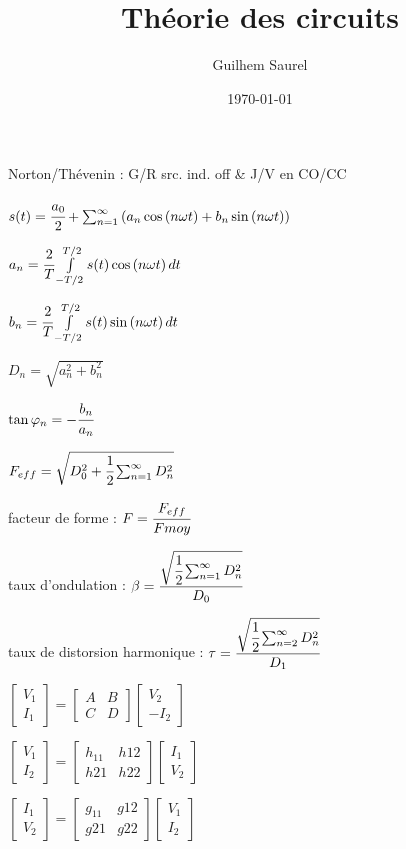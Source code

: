 \documentclass[10pt,twocolumn,a4paper]{article}
\title{Théorie des circuits}
\date{\today}
\author{Guilhem Saurel}
\begin{document}
\maketitle
Norton/Thévenin : G/R src. ind. off \& J/V en CO/CC

$s(t)= \cfrac{a_0}{2} + \sum_{n=1}^{\infty}{\left( a_n \cos\left(n\omega t\right) + b_n \sin\left(n \omega t \right) \right)}$

$a_n = \cfrac{2}{T} \int \limits_{-T/2}^{T/2}{s(t)\cos\left(n\omega t\right) dt}$

$b_n = \cfrac{2}{T} \int \limits_{-T/2}^{T/2}{s(t)\sin\left(n\omega t\right) dt}$

$D_n = \sqrt{a_n^2+b_n^2}$

$\tan\varphi_n = - \cfrac{b_n}{a_n}$

$F_{eff} = \sqrt{D_0^2 + \cfrac{1}{2}\sum_{n=1}^{\infty}{D_n^2}}$

facteur de forme : $F = \cfrac{F_{eff}}{F{moy}}$

taux d'ondulation : $\beta = \cfrac{\sqrt{\cfrac{1}{2}\sum_{n=1}^{\infty}{D_n^2}}}{D_0}$

taux de distorsion harmonique : $\tau = \cfrac{\sqrt{\cfrac{1}{2}\sum_{n=2}^{\infty}{D_n^2}}}{D_1}$

$\begin{bmatrix}V_1 \\ I_1\end{bmatrix} = \begin{bmatrix}A&B\\C&D \end{bmatrix}\begin{bmatrix}V_2\\-I_2 \end{bmatrix}$

$\begin{bmatrix}V_1\\I_2 \end{bmatrix} =\begin{bmatrix}h_{11}&h{12}\\h{21}&h{22} \end{bmatrix}\begin{bmatrix}I_1\\V_2 \end{bmatrix} $

$\begin{bmatrix}I_1\\V_2 \end{bmatrix} =\begin{bmatrix}g_{11}&g{12}\\g{21}&g{22} \end{bmatrix}\begin{bmatrix}V_1\\I_2 \end{bmatrix} $
\end{document}
